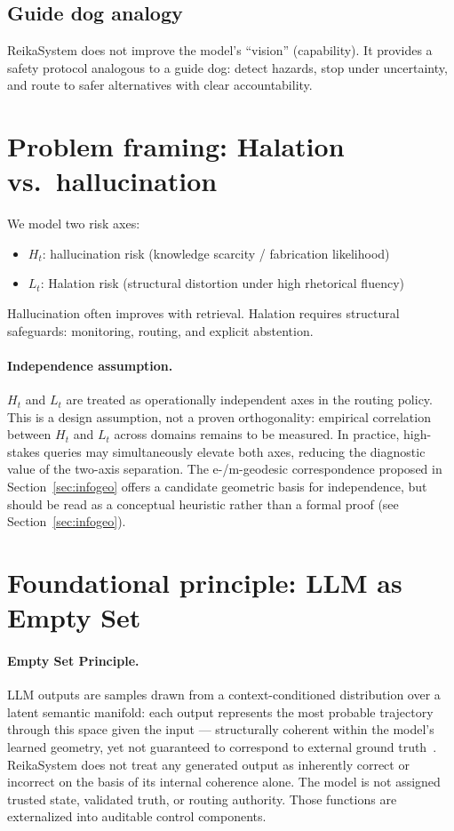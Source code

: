 \documentclass[11pt,a4paper]{article}
\begin{document}
\subsection{Guide dog analogy}
ReikaSystem does not improve the model's ``vision'' (capability). It provides a safety protocol
analogous to a guide dog: detect hazards, stop under uncertainty, and route to safer alternatives
with clear accountability.

\section{Problem framing: Halation vs.\ hallucination}

We model two risk axes:
\begin{itemize}
\item $H_t$: hallucination risk (knowledge scarcity / fabrication likelihood)
\item $L_t$: Halation risk (structural distortion under high rhetorical fluency)
\end{itemize}

Hallucination often improves with retrieval. Halation requires structural safeguards:
monitoring, routing, and explicit abstention.

\paragraph{Independence assumption.}
$H_t$ and $L_t$ are treated as operationally independent axes in the routing policy.
This is a design assumption, not a proven orthogonality: empirical correlation between
$H_t$ and $L_t$ across domains remains to be measured.
In practice, high-stakes queries may simultaneously elevate both axes,
reducing the diagnostic value of the two-axis separation.
The e-/m-geodesic correspondence proposed in Section~\ref{sec:infogeo}
offers a candidate geometric basis for independence, but should be read
as a conceptual heuristic rather than a formal proof (see Section~\ref{sec:infogeo}).

\section{Foundational principle: LLM as Empty Set}

\paragraph{Empty Set Principle.}
LLM outputs are samples drawn from a context-conditioned distribution over a latent semantic
manifold: each output represents the most probable trajectory through this space given the
input --- structurally coherent within the model's learned geometry, yet not guaranteed to
correspond to external ground truth~\cite{mabrok2026latent}.
ReikaSystem does not treat any generated output as inherently correct or incorrect on the
basis of its internal coherence alone.
The model is not assigned trusted state, validated truth, or routing authority. Those
functions are externalized into auditable control components.
\end{document}
